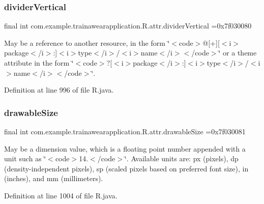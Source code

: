 \subsubsection{\texorpdfstring{dividerVertical}{dividerVertical}}
{\footnotesize\ttfamily final int com.\+example.\+trainawearapplication.\+R.\+attr.\+divider\+Vertical =0x7f030080\hspace{0.3cm}{\ttfamily [static]}}

May be a reference to another resource, in the form \char`\"{}$<$code$>$@\mbox{[}+\mbox{]}\mbox{[}$<$i$>$package$<$/i$>$\+:\mbox{]}$<$i$>$type$<$/i$>$/$<$i$>$name$<$/i$>$$<$/code$>$\char`\"{} or a theme attribute in the form \char`\"{}$<$code$>$?\mbox{[}$<$i$>$package$<$/i$>$\+:\mbox{]}$<$i$>$type$<$/i$>$/$<$i$>$name$<$/i$>$$<$/code$>$\char`\"{}. 

Definition at line 996 of file R.\+java.

\mbox{\label{classcom_1_1example_1_1trainawearapplication_1_1_r_1_1attr_a9abe5d8dadb5131680b787576e225ef3}} 
\subsubsection{\texorpdfstring{drawableSize}{drawableSize}}
{\footnotesize\ttfamily final int com.\+example.\+trainawearapplication.\+R.\+attr.\+drawable\+Size =0x7f030081\hspace{0.3cm}{\ttfamily [static]}}

May be a dimension value, which is a floating point number appended with a unit such as \char`\"{}$<$code$>$14.\+5sp$<$/code$>$\char`\"{}. Available units are\+: px (pixels), dp (density-\/independent pixels), sp (scaled pixels based on preferred font size), in (inches), and mm (millimeters). 

Definition at line 1004 of file R.\+java.

\mbox{\label{classcom_1_1example_1_1trainawearapplication_1_1_r_1_1attr_a5316a2fabeb6c459b3e85fa509642c44}} 
